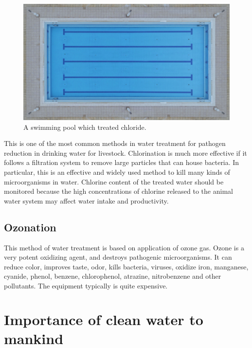 \documentclass[]{book}
\begin{document}
\begin{figure}

{\centering \includegraphics[width=1\linewidth]{figures/swimming-pool} 

}

\caption{A swimming pool which treated chloride.}\label{fig:swimming-pool}
\end{figure}

This is one of the most common methods in water treatment for pathogen
reduction in drinking water for livestock. Chlorination is much more
effective if it follows a filtration system to remove large particles
that can house bacteria. In particular, this is an effective and widely
used method to kill many kinds of microorganisms in water. Chlorine
content of the treated water should be monitored because the high
concentrations of chlorine released to the animal water system may
affect water intake and productivity.

\subsection{Ozonation}\label{ozonation}

This method of water treatment is based on application of ozone gas.
Ozone is a very potent oxidizing agent, and destroys pathogenic
microorganisms. It can reduce color, improves taste, odor, kills
bacteria, viruses, oxidize iron, manganese, cyanide, phenol, benzene,
chlorophenol, atrazine, nitrobenzene and other pollutants. The equipment
typically is quite expensive.

\section{Importance of clean water to
mankind}\label{importance-of-clean-water-to-mankind}
\end{document}
